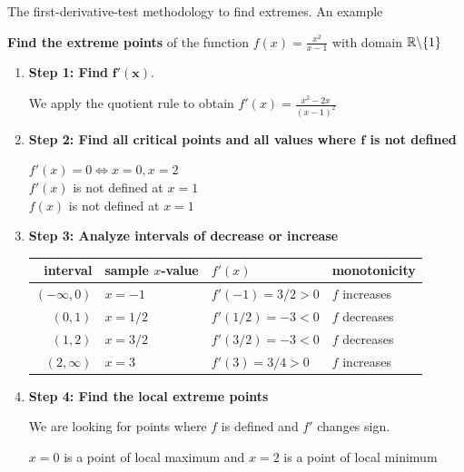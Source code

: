 \documentclass[9pt]{beamer}
\begin{document}
\begin{frame}{The first-derivative-test methodology to find  extremes. An example}

    {\hspace{0.4cm}
    \textbf{Find the  extreme points} of the function \href{https://www.desmos.com/calculator/a6rnvzud0w}{$f(x) = \frac{x^2}{x - 1}$} with domain $\mathbb{R}\backslash\{1\}$
    }
    
    \begin{enumerate}[leftmargin = 0.5cm, label = , rightmargin = 0.2cm]

        \item \textbf{Step 1: Find} $\pmb{f'(x)}$.

        We apply the quotient rule to obtain $f'(x) = \frac{x^2 - 2x}{(x - 1)^2}$

        \item \textbf{Step 2: Find all critical points and all values where $\pmb{f}$ is not defined}

        $f'(x) = 0 \Leftrightarrow x = 0, x = 2$ \\
        $f'(x)$ is not defined at $x = 1$ \\
        $f(x)$ is not defined at $x = 1$

        \item \textbf{Step 3: Analyze intervals of decrease or increase}

        \begin{table}
        \begin{flushleft}
        \begin{tabular}{r|lll}
            interval        & sample $x$-value  & $f'(x)$ & monotonicity \\ \hline
            $(-\infty, 0)$  & $x = -1$          & $f'(-1) = 3/2 > 0$    & $f$ increases \\
            $(0, 1)$        & $x = 1/2$         & $f'(1/2) = -3 < 0$     & $f$ decreases \\
            $(1, 2)$        & $x = 3/2$         & $f'(3/2) = -3 < 0$     & $f$ decreases \\
            $(2, \infty)$   & $x = 3$         & $f'(3) = 3/4 > 0$     & $f$ increases
        \end{tabular}
        \end{flushleft}
        \end{table}
        

        \item \textbf{Step 4: Find the local extreme points}
        
        We are looking for points where $f$ is defined and $f'$ changes sign.

        $x = 0$ is a point of local maximum and $x = 2$ is a point of local minimum

    \end{enumerate}
    
\end{frame}
\end{document}
